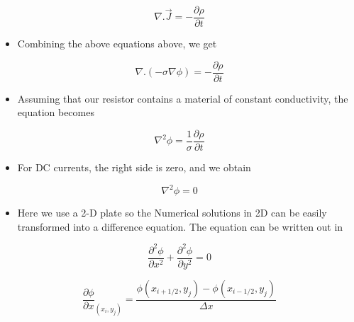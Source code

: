 \documentclass[11pt, a4paper, twoside]{article}
\begin{document}
    \begin{equation}
    \nabla.\vec{J} = -\frac{\partial \rho}{\partial t}
       \end{equation}
    
    \begin{itemize}
    \item
      Combining the above equations above, we get
    \end{itemize}
    
    \begin{equation}
    \nabla.(-\sigma\nabla\phi) = -\frac{\partial \rho}{\partial t}
       \end{equation}
    
    \begin{itemize}
    \item
      Assuming that our resistor contains a material of constant
      conductivity, the equation becomes
    \end{itemize}
    
    \begin{equation}
    \nabla^{2}\phi = \frac{1}{\sigma}\frac{\partial \rho}{\partial t}
       \end{equation}
    
    \begin{itemize}
    \item
      For DC currents, the right side is zero, and we obtain
    \end{itemize}
    
    \begin{equation}
    \nabla^{2}\phi = 0
       \end{equation}
    
    \begin{itemize}
    \item
      Here we use a 2-D plate so the Numerical solutions in 2D can be easily
      transformed into a difference equation. The equation can be written
      out in
    \end{itemize}
    
    \begin{equation}
    \frac{\partial^{2} \phi}{\partial x^{2}}+ \frac{\partial^{2} \phi}{\partial y^{2}} = 0
     \end{equation}
    
    \begin{equation}
    \frac{\partial \phi}{\partial x}_{(x_i,y_j)} = \frac{\phi(x_{i+1/2},y_j) - \phi(x_{i-1/2},y_j)}{\Delta x}
     \end{equation}
    
\end{document}
